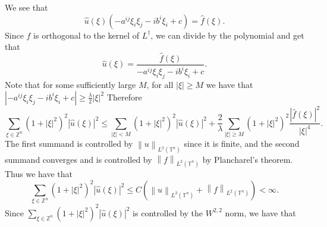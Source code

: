 \documentclass[12pt, a4paper]{article}
\theoremstyle{definition}
\newcommand{\Z}{\mathbb{Z}}                           %
\newcommand{\T}{\mathbb{T}}                         %
\newcommand{\norm}[1]{\left\lVert#1\right\rVert}
\begin{document}
We see that $$\hat{u} (\xi ) (-a^{ij} \xi_i \xi_j - i b^i \xi_i +c) = \hat{f}(\xi).$$
Since $f$ is orthogonal to the kernel of $L^\dagger$, we can divide by the polynomial and get that 
$$\hat{u} (\xi) = \frac{\hat{f}(\xi)}{-a^{ij} \xi_i \xi_j - i b^i \xi_i +c}.$$ Note that for some sufficiently large $M$, for all $|\xi|\geq M$ we have that $|-a^{ij} \xi_i \xi_j - i b^i \xi_i +c| \geq \frac{\lambda}{2} |\xi |^2$
Therefore 
$$\sum_{\xi \in \Z^n} (1+|\xi|^2)^2 |\hat{u}(\xi)|^2  \leq  \sum_{|\xi |< M} (1+|\xi|^2)^2 |\hat{u}(\xi)|^2 + \frac{2}{\lambda }\sum_{|\xi| \geq M} (1+|\xi|^2)^2 \frac{|\hat{f}(\xi)|^2}{|\xi|^4}.$$
The first summand is controlled by $\norm{u}_{L^2(\T^n)}$ since it is finite, and the second summand converges and is controlled by $\norm{f}_{L^2(\T^n)}$ by Plancharel's theorem. Thus we have that 
$$\sum_{\xi \in \Z^n} (1+|\xi|^2)^2 |\hat{u}(\xi)|^2 \leq C \left( \norm{u}_{L^2(\T^n)} + \norm{f}_{L^2(\T^n)}\right) < \infty. $$ Since $\sum_{\xi \in \Z^n} (1+|\xi|^2)^2 |\hat{u}(\xi)|^2$ is controlled by the $W^{2,2}$ norm, we have that 
\end{document}

